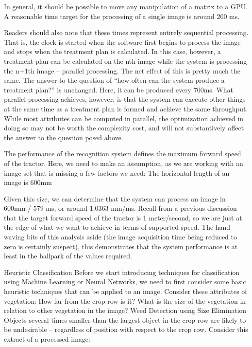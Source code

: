 \documentclass[letterpaper]{article}
\begin{document}
In general, it should be possible to move any manipulation of a matrix to a GPU. A reasonable time target for the processing of a single image is around 200 ms.

Readers should also note that these times represent entirely sequential processing. That is, the clock is started when the software first begins to process the image and stops when the treatment plan is calculated. In this case, however, a treatment plan can be calculated on the nth image while the system is processing the n+1th image -- parallel processing. The net effect of this is pretty much the same. The answer to the question of “how often can the system produce a treatment plan?” is unchanged. Here, it can be produced every 700ms. What parallel processing achieves, however, is that the system can execute other things at the same time as a treatment plan is formed and achieve the same throughput. While most attributes can be computed in parallel, the optimization achieved in doing so may not be worth the complexity cost, and will not substantively affect the answer to the question posed above.

The performance of the recognition system defines the maximum forward speed of the tractor. Here, we need to make an assumption, as we are working with an image set that is missing a few factors we need:
The horizontal length of an image is 600mm

Given this size, we can determine that the system can process an image in 600mm / 579 ms, or around 1.0363 mm/ms. Recall from a previous discussion that the target forward speed of the tractor is 1 meter/second, so we are just at the edge of what we want to achieve in terms of supported speed. The hand-waving bits of this analysis aside (the image acquisition time being reduced to zero is certainly suspect), this demonstrates that the system performance is at least in the ballpark of the values required.

Heuristic Classification
Before we start introducing techniques for classification using Machine Learning or Neural Networks, we need to first consider some basic heuristic techniques that can be applied to an image.  Consider these attributes of vegetation:
How far from the crop row is it?
What is the size of the vegetation in relation to other vegetation in the image?
Weed Detection using Size Elimination
Objects several times smaller than the largest object in the crop row are likely to be undesirable -- regardless of position with respect to the crop row. Consider this extract of a processed image:
\end{document}
